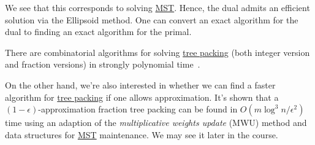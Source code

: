 We see that this corresponds to solving \hyperref[prb:MST]{MST}. Hence, the dual admits an efficient solution via the Ellipsoid method. One can convert an exact algorithm for the dual to finding an exact algorithm for the primal.

\begin{remark}
	There are combinatorial algorithms for solving \hyperref[prb:TP]{tree packing} (both integer version and fraction versions) in strongly polynomial time~\cite{schrijver2003combinatorial}.
\end{remark}

On the other hand, we're also interested in whether we can find a faster algorithm for \hyperref[prb:TP]{tree packing} if one allows approximation. It's shown that a \((1 - \epsilon )\)-approximation fraction tree packing can be found in \(O(m \log ^3 n / \epsilon ^2)\) time using an adaption of the \emph{multiplicative weights update} (MWU) method and data structures for \hyperref[prb:MST]{MST} maintenance. We may see it later in the course.